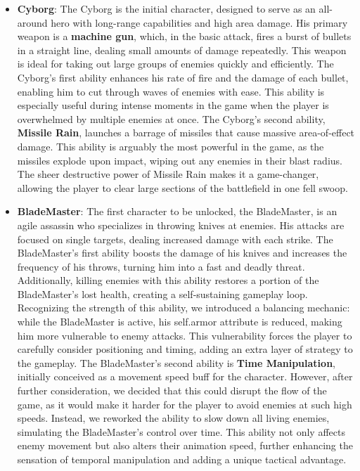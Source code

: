 \documentclass[a4paper,12pt]{article}
\begin{document}
\begin{itemize}
    \item \textbf{Cyborg}: The Cyborg is the initial character, designed to serve as an all-around hero with long-range capabilities and high area damage. His primary weapon is a \textbf{machine gun}, which, in the basic attack, fires a burst of bullets in a straight line, dealing small amounts of damage repeatedly. This weapon is ideal for taking out large groups of enemies quickly and efficiently. The Cyborg's first ability enhances his rate of fire and the damage of each bullet, enabling him to cut through waves of enemies with ease. This ability is especially useful during intense moments in the game when the player is overwhelmed by multiple enemies at once. The Cyborg's second ability, \textbf{Missile Rain}, launches a barrage of missiles that cause massive area-of-effect damage. This ability is arguably the most powerful in the game, as the missiles explode upon impact, wiping out any enemies in their blast radius. The sheer destructive power of Missile Rain makes it a game-changer, allowing the player to clear large sections of the battlefield in one fell swoop.

    \item \textbf{BladeMaster}: The first character to be unlocked, the BladeMaster, is an agile assassin who specializes in throwing knives at enemies. His attacks are focused on single targets, dealing increased damage with each strike. The BladeMaster’s first ability boosts the damage of his knives and increases the frequency of his throws, turning him into a fast and deadly threat. Additionally, killing enemies with this ability restores a portion of the BladeMaster’s lost health, creating a self-sustaining gameplay loop. Recognizing the strength of this ability, we introduced a balancing mechanic: while the BladeMaster is active, his self.armor attribute is reduced, making him more vulnerable to enemy attacks. This vulnerability forces the player to carefully consider positioning and timing, adding an extra layer of strategy to the gameplay. The BladeMaster's second ability is \textbf{Time Manipulation}, initially conceived as a movement speed buff for the character. However, after further consideration, we decided that this could disrupt the flow of the game, as it would make it harder for the player to avoid enemies at such high speeds. Instead, we reworked the ability to slow down all living enemies, simulating the BladeMaster's control over time. This ability not only affects enemy movement but also alters their animation speed, further enhancing the sensation of temporal manipulation and adding a unique tactical advantage.


\end{itemize}
\end{document}

